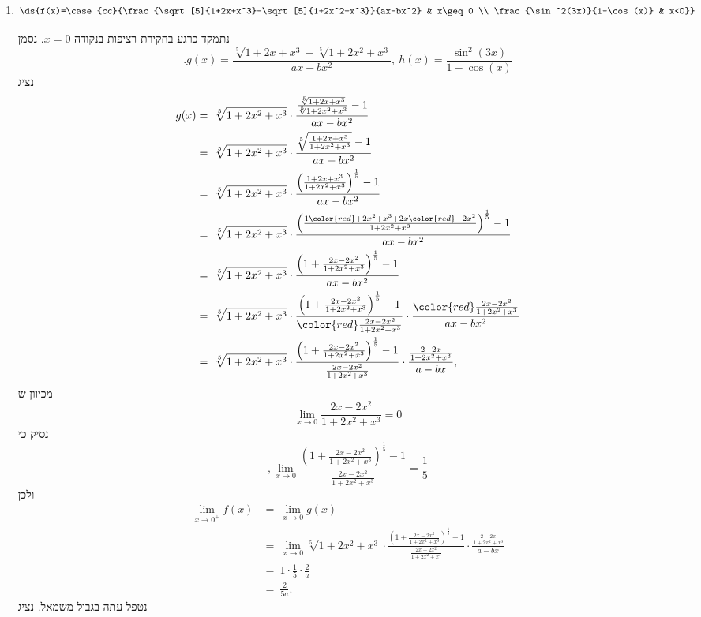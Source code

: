 \begin{enumerate}
\item $$\ds{f(x)=\case{cc}{\frac{\sqrt[5]{1+2x+x^3}-\sqrt[5]{1+2x^2+x^3}}{ax-bx^2} & x\geq 0  \\ \frac{\sin^2(3x)}{1-\cos(x)} & x<0}}$$
\begin{solbox}
נתמקד כרגע בחקירת רציפות בנקודה
$x=0$.
נסמן
$$.g(x)=\frac{\sqrt[5]{1+2x+x^3}-\sqrt[5]{1+2x^2+x^3}}{ax-bx^2},\ h(x)=\frac{\sin^2(3x)}{1-\cos(x)}$$
נציג
\begin{align*}
    g(x)&=\ \sqrt[5]{1+2x^2+x^3}\cdot\frac{\frac{\sqrt[5]{1+2x+x^3}}{\sqrt[5]{1+2x^2+x^3}}-1}{ax-bx^2}\\
    &=\ \sqrt[5]{1+2x^2+x^3}\cdot\frac{\sqrt[5]{\frac{1+2x+x^3}{{1+2x^2+x^3}}}-1}{ax-bx^2}\\
    &=\ \sqrt[5]{1+2x^2+x^3}\cdot\frac{\left(\frac{1+2x+x^3}{{1+2x^2+x^3}}\right)^{\frac{1}{5}}-1}{ax-bx^2}\\
    &=\ \sqrt[5]{1+2x^2+x^3}\cdot\frac{\left(\frac{1{\color{red}+2x^2}+x^3+2x{\color{red}-2x^2}}{{1+2x^2+x^3}}\right)^{\frac{1}{5}}-1}{ax-bx^2}\\
    &=\ \sqrt[5]{1+2x^2+x^3}\cdot\frac{\left(1+\frac{2x-2x^2}{1+2x^2+x^3}\right)^{\frac{1}{5}}-1}{ax-bx^2}\\
    &=\ \sqrt[5]{1+2x^2+x^3}\cdot\frac{\left(1+\frac{2x-2x^2}{1+2x^2+x^3}\right)^{\frac{1}{5}}-1}{\color{red}\frac{2x-2x^2}{1+2x^2+x^3}}\cdot\frac{\color{red}\frac{2x-2x^2}{1+2x^2+x^3}}{ax-bx^2}\\
    &=\ \sqrt[5]{1+2x^2+x^3}\cdot\frac{\left(1+\frac{2x-2x^2}{1+2x^2+x^3}\right)^{\frac{1}{5}}-1}{\frac{2x-2x^2}{1+2x^2+x^3}}\cdot\frac{\frac{2-2x}{1+2x^2+x^3}}{a-bx},
\end{align*}
מכיוון ש-
$$\lim_{x\to0}\frac{2x-2x^2}{1+2x^2+x^3}=0$$
נסיק כי
$$,\lim_{x\to0}\frac{\left(1+\frac{2x-2x^2}{1+2x^2+x^3}\right)^{\frac{1}{5}}-1}{\frac{2x-2x^2}{1+2x^2+x^3}}=\frac{1}{5}$$
ולכן
\begin{align*}
    \lim_{x\to0^+}f(x)&=\ \lim_{x\to0}g(x)\\
    &=\ \lim_{x\to0}\sqrt[5]{1+2x^2+x^3}\cdot\frac{\left(1+\frac{2x-2x^2}{1+2x^2+x^3}\right)^{\frac{1}{5}}-1}{\frac{2x-2x^2}{1+2x^2+x^3}}\cdot\frac{\frac{2-2x}{1+2x^2+x^3}}{a-bx}\\
    &=\ 1\cdot\frac{1}{5}\cdot\frac{2}{a}\\
    &=\ \frac{2}{5a}.
\end{align*}
נטפל עתה בגבול משמאל.
נציג

\end{solbox}
\end{enumerate}

